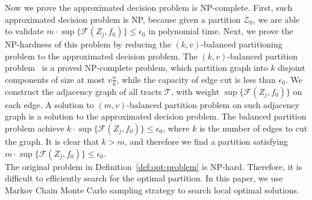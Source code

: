 Now we prove the approximated decision problem is NP-complete. First, such approximated decision problem is NP, because given a partition $\mathcal{Z}_0$, we are able to validate $m \cdot \sup \{ \mathcal{F}(Z_j, f_0)\} \leq \epsilon_0$ in polynomial time. Next, we prove the NP-hardness of this problem by reducing the $(k,v)$-balanced partitioning problem to the approximated decision problem. The $(k,v)$-balanced partition problem~\cite{andreev2006balanced} is a proved NP-complete problem, which partition graph into $k$ disjoint components of size at most $v\frac{n}{k}$, while the capacity of edge cut is less than $\epsilon_0$. We construct the adjacency graph of all tracts $\mathcal{T}$, with weight $\sup \{\mathcal{F}(Z_j, f_0) \}$ on each edge. A solution to $(m,v)$-balanced partition problem on such adjacency graph is a solution to the approximated decision problem. The balanced partition problem achieve $k \cdot \sup \{\mathcal{F}(Z_j, f_0) \} \leq \epsilon_0$, where $k$ is the number of edges to cut the graph. It is clear that $k > m$, and therefore we find a partition satisfying $m \cdot \sup \{ \mathcal{F}(Z_j, f_0)\} \leq \epsilon_0$. \\


The original problem in Definition~\ref{def:opt-problem} is NP-hard. Therefore, it is difficult to efficiently search for the optimal partition. In this paper, we use Markov Chain Monte Carlo sampling strategy to search local optimal solutions.
